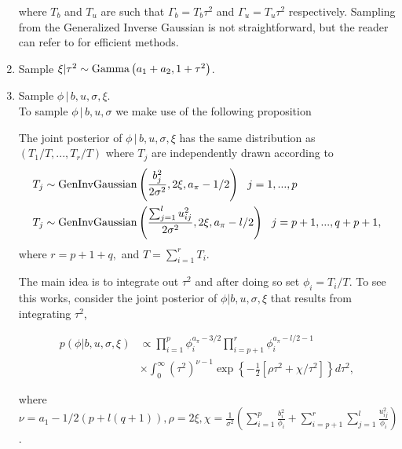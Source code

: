 \begin{enumerate}
        where $T_b$ and $T_u$ are such that $\Gamma_b=T_b \tau^2 $ and $\Gamma_u=T_u \tau^2 $ respectively. Sampling from the Generalized Inverse Gaussian is not straightforward, but the reader can refer to \cite{GenInvGaussian} for efficient methods.\\

		\item Sample $\xi | \tau^2   \sim \text{Gamma} \left( a_1+a_2 , 1+\tau^2 \right) $.\\
		\item Sample $\phi \,|\, b, u, \sigma, \xi $. \\

		To sample $\phi \,|\, b, u, \sigma $ we make use of the following proposition
		\begin{prop}
		    The joint posterior of $\phi \,|\,  b, u, \sigma, \xi  $ has the same distribution as $\left(T_1/T,..., T_r/T \right)$ where $T_j$ are independently drawn according to
		\begin{align*}
		   T_j  &\sim \text{GenInvGaussian} \left(  \frac{b_j^2}{2\sigma^2} , 2\xi, a_\pi-1/2\right) \ \  j=1,...,p \\
		  T_j  &\sim \text{GenInvGaussian} \left( \frac{  \sum_{j=1}^l u_{ij}^2   }{2\sigma^2}  , 2\xi, a_\pi - l/2 \right)  \ \   j=p+1,..., q+p+1,
		\end{align*}
		where $r= p+1+q,$ and $T= \sum_{i=1}^r T_i$.
		\end{prop}

		The main idea is to integrate out $\tau^2$ and after doing so set $\phi_i= T_i/T$. To see this works, consider the joint posterior of $\phi  | b, u, \sigma, \xi$ that results from integrating $\tau^2$,
		\begin{small}
		\begin{equation}
		    	\begin{aligned}
			\label{eq:gibbs1}
				p(\phi | b, u, \sigma,\xi  ) &\propto \prod_{i=1}^p \phi_i^{a_\pi-3/2} \prod_{i=p+1}^r \phi_i^{a_\pi-l/2-1} \\
				&\times \int_{0}^\infty (\tau^2)^{\nu-1} \exp \left\lbrace -\frac{1}{2} \left[  \rho \tau^2 +\chi/\tau^2    \right]  \right\rbrace d\tau^2,
			\end{aligned}
		\end{equation}
		\end{small}

		where $ \nu= a_1-1/2(p+l(q+1)), \rho= 2\xi, \chi= \frac{1}{\sigma^2} \left( \sum\limits_{i=1}^p \frac{b_i^2}{\phi_i}+ \sum\limits_{i=p+1}^r \sum\limits_{j=1}^l \frac{u_{ij}^2}{\phi_i} \right)$.



\end{enumerate}
